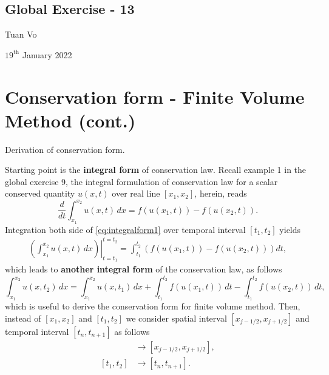 \documentclass[12pt]{article}
\begin{document}
\begin{center}
	\section*{Global Exercise - 13}
\end{center}
\begin{center}
	Tuan Vo
\end{center}
\begin{center}
	$19^{\text{th}}$ January 2022
\end{center}
\section{Conservation form - Finite Volume Method (cont.)}
\begin{example}
	Derivation of conservation form.
\end{example}
Starting point is the \textbf{integral form} of conservation law. Recall example 1
in the global exercise 9, the integral formulation of conservation law
for a scalar conserved quantity $u(x,t)$ over real line $[x_1,x_2]$, herein, reads
\begin{equation}\label{eq:integralform1}
	\boxed{
		\frac{d}{dt}\int_{x_{1}}^{x_{2}} u(x,t)\,dx = f(u(x_{1},t)) - f(u(x_{2},t)).
	}
\end{equation}
Integration both side of \eqref{eq:integralform1} over temporal interval $[t_1,t_2]$ yields
\begin{align}
	\left.\left( \int_{x_{1}}^{x_{2}} u(x,t)\,dx\right) \right|_{t=t_1}^{t=t_2}
	= \int_{t_1}^{t_2} \left( f(u(x_{1},t)) - f(u(x_{2},t)) \right)dt,
\end{align}
which leads to \textbf{another integral form} of the conservation law, as follows
\begin{equation}\label{eq:integralform2}
	\boxed{
		\int_{x_{1}}^{x_{2}} u(x,t_2)\,dx = 
		\int_{x_{1}}^{x_{2}} u(x,t_1)\,dx
		+ \int_{t_1}^{t_2} f(u(x_{1},t)) \,dt
		- \int_{t_1}^{t_2} f(u(x_{2},t)) \,dt,
	}
\end{equation}
which is useful to derive the conservation form for finite volume method.
Then, instead of $[x_1,x_2]$ and $[t_1,t_2]$
we consider spatial interval $[x_{j-1/2},x_{j+1/2}]$
and temporal interval $[t_n,t_{n+1}]$ as follows
\begin{align}
	[x_1,x_2] & \rightarrow [x_{j-1/2},x_{j+1/2}], \\
	[t_1,t_2] & \rightarrow [t_n,t_{n+1}].
\end{align}
\end{document}
